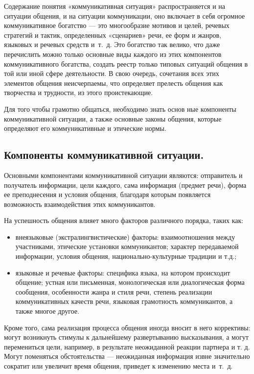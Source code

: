 Содержание понятия «коммуникативная ситуация» распространяется и на ситуации общения, и на ситуации коммуникации, оно включает в себя огромное коммуникативное богатство — это многообразие мотивов и целей, речевых стратегий и тактик, определенных «сценариев» речи, ее форм и жанров, языковых и речевых средств и~т.~д.
Это богатство так велико, что даже перечислить можно только основные виды каждого из этих компонентов коммуникативного богатства, создать реестр только типовых ситуаций общения в той или иной сфере деятельности.
В свою очередь, сочетания всех этих элементов общения неисчерпаемы, что определяет прелесть общения как творчества и трудности, из
этого проистекающие.

Для того чтобы грамотно общаться, необходимо знать основ
ные компоненты коммуникативной ситуации, а также основные
законы общения, которые определяют его коммуникативные и
этические нормы.

\subsection*{Компоненты коммуникативной ситуации.}

Основными компонентами коммуникативной ситуации являются: отправитель и получатель информации, цели каждого, сама информация (предмет речи), форма ее преподнесения и условия общения, благодаря которым появляется возможность взаимодействия этих коммуникантов.

На успешность общения влияет много факторов различного
порядка, таких как:

\begin{itemize}
    \item внеязыковые (экстралингвистические) факторы: взаимоотношения между участниками, этические установки коммуникантов; характер передаваемой информации, условия общения, национально-культурные традиции и т.д.;
    \item языковые и речевые факторы: специфика языка, на котором происходит общение; устная или письменная, монологическая или диалогическая форма сообщения, особенности жанра и стиля речи, степень реализации коммуникативных качеств речи, языковая грамотность коммуникантов, а также многое другое.
\end{itemize}

Кроме того, сама реализация процесса общения иногда вносит в него коррективы: могут возникнуть стимулы к дальнейшему развертыванию высказывания, а могут перемениться цели, например, в результате неожиданной реакции партнера и т. д.
Могут поменяться обстоятельства --- неожиданная информация извне значительно сократит или увеличит время общения, приведет к изменению места и~т.~д.

